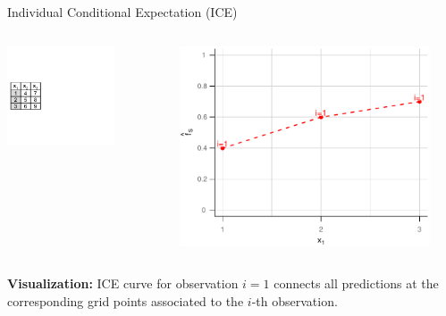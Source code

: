 \documentclass[aspectratio=169]{../latex_main/tntbeamer}  %
\begin{document}
\begin{frame}{Individual Conditional Expectation (ICE)}

\begin{columns}[T]
\begin{column}{0.55\textwidth}
\vspace*{-\topsep}
\vspace*{0.5\lineskip}
\includegraphics[page=5, trim=-3.69cm 0cm 3.69cm 0cm, width=0.7\textwidth]{figure/ice_pd_plot_demo}
\end{column}
\begin{column}{0.45\textwidth}

\begin{center}
\includegraphics[page=1, width=0.9\textwidth]{figure/ICE}
\end{center}

\end{column}
\end{columns}
\vspace*{\topsep}

\textbf{Visualization:} ICE curve for observation $i=1$ connects all predictions at the corresponding grid points associated to the $i$-th observation.

\end{frame}
\end{document}
